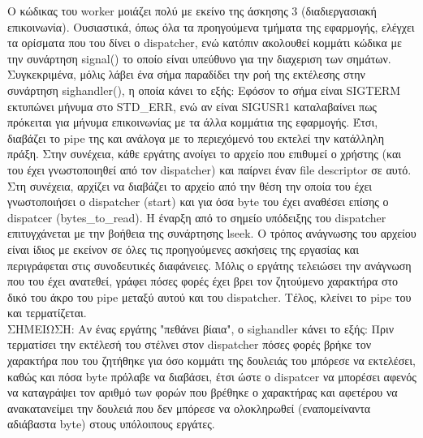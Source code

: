 \documentclass{article}
\begin{document}
	Ο κώδικας του worker μοιάζει πολύ με εκείνο της άσκησης 3 (διαδιεργασιακή επικοινωνία). Ουσιαστικά, όπως όλα τα προηγούμενα τμήματα της εφαρμογής, ελέγχει τα ορίσματα που του δίνει ο dispatcher, ενώ κατόπιν ακολουθεί κομμάτι κώδικα με την συνάρτηση signal() το οποίο είναι υπεύθυνο για την διαχεριση των σημάτων. Συγκεκριμένα, μόλις λάβει ένα σήμα παραδίδει την ροή της εκτέλεσης στην συνάρτηση sighandler(), η οποία κάνει το εξής: Εφόσον το σήμα είναι SIGTERM εκτυπώνει μήνυμα στο STD\_ERR, ενώ αν είναι SIGUSR1 καταλαβαίνει πως πρόκειται για μήνυμα επικοινωνίας με τα άλλα κομμάτια της εφαρμογής. Έτσι, διαβάζει το pipe της και ανάλογα με το περιεχόμενό του εκτελεί την κατάλληλη πράξη. Στην συνέχεια, κάθε εργάτης ανοίγει το αρχείο που επιθυμεί ο χρήστης (και του έχει γνωστοποιηθεί από τον dispatcher) και παίρνει έναν file descriptor σε αυτό. Στη συνέχεια, αρχίζει να διαβάζει το αρχείο από την θέση την οποία του έχει γνωστοποιήσει ο dispatcher (start) και για όσα byte του έχει αναθέσει επίσης ο dispatcer (bytes\_to\_read). Η έναρξη από το σημείο υπόδειξης του dispatcher επιτυγχάνεται με την βοήθεια της συνάρτησης lseek. Ο τρόπος ανάγνωσης του αρχείου είναι ίδιος με εκείνον σε όλες τις προηγούμενες ασκήσεις της εργασίας και περιγράφεται στις συνοδευτικές διαφάνειες. Μόλις ο εργάτης τελειώσει την ανάγνωση που του έχει ανατεθεί, γράφει πόσες φορές έχει βρει τον ζητούμενο χαρακτήρα στο δικό του άκρο του pipe μεταξύ αυτού και του dispatcher. Τέλος, κλείνει το pipe του και τερματίζεται. \\

\noindent ΣΗΜΕΙΩΣΗ: Αν ένας εργάτης "πεθάνει βίαια", ο sighandler κάνει το εξής: Πριν τερματίσει την εκτέλεσή του στέλνει στον dispatcher πόσες φορές βρήκε τον χαρακτήρα που του ζητήθηκε για όσο κομμάτι της δουλειάς του μπόρεσε να εκτελέσει, καθώς και πόσα byte πρόλαβε να διαβάσει, έτσι ώστε ο dispatcer να μπορέσει αφενός να καταγράψει τον αριθμό των φορών που βρέθηκε ο χαρακτήρας και αφετέρου να ανακατανείμει την δουλειά που δεν μπόρεσε να ολοκληρωθεί (εναπομείναντα αδιάβαστα byte) στους υπόλοιπους εργάτες.
	
\end{document}
